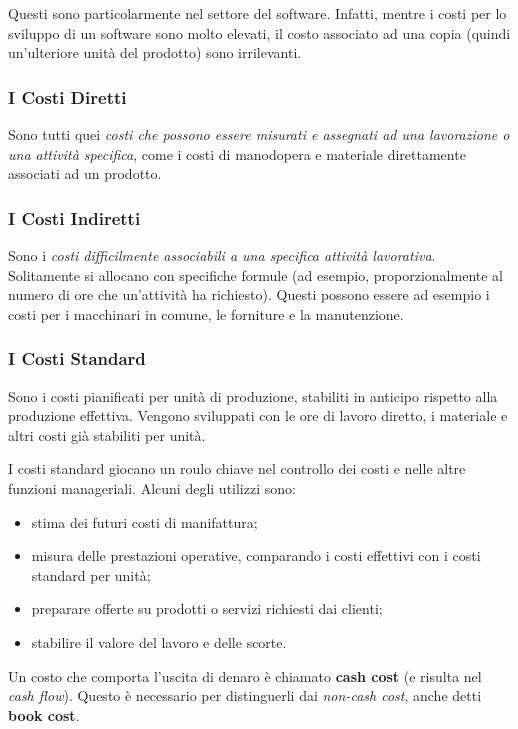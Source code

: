 \documentclass[a4paper,portrait,12pt]{article}
\theoremstyle{definition}
\begin{document}
Questi sono particolarmente nel settore del software.
Infatti, mentre i costi per lo sviluppo di un software sono molto elevati, il costo associato ad una copia (quindi un'ulteriore unità del prodotto) sono irrilevanti.

\subsubsection{I Costi Diretti}
Sono tutti quei \emph{costi che possono essere misurati e assegnati ad una lavorazione o una attività specifica}, come i costi di manodopera e materiale direttamente associati ad un prodotto.

\subsubsection{I Costi Indiretti}
Sono i \emph{costi difficilmente associabili a una specifica attività lavorativa}.
Solitamente si allocano con specifiche formule (ad esempio, proporzionalmente al numero di ore che un'attività ha richiesto).
Questi possono essere ad esempio i costi per i macchinari in comune, le forniture e la manutenzione.

\subsubsection{I Costi Standard}
Sono i costi pianificati per unità di produzione, stabiliti in anticipo rispetto alla produzione effettiva.
Vengono sviluppati con le ore di lavoro diretto, i materiale e altri costi già stabiliti per unità.

I costi standard giocano un roulo chiave nel controllo dei costi e nelle altre funzioni manageriali.
Alcuni degli utilizzi sono:
\begin{itemize}
\item stima dei futuri costi di manifattura;
\item misura delle prestazioni operative, comparando i costi effettivi con i costi standard per unità;
\item preparare offerte su prodotti o servizi richiesti dai clienti;
\item stabilire il valore del lavoro e delle scorte.
\end{itemize}

Un costo che comporta l'uscita di denaro è chiamato \textbf{cash cost} (e risulta nel \emph{cash flow}).
Questo è necessario per distinguerli dai \emph{non-cash cost}, anche detti \textbf{book cost}.
\end{document}
